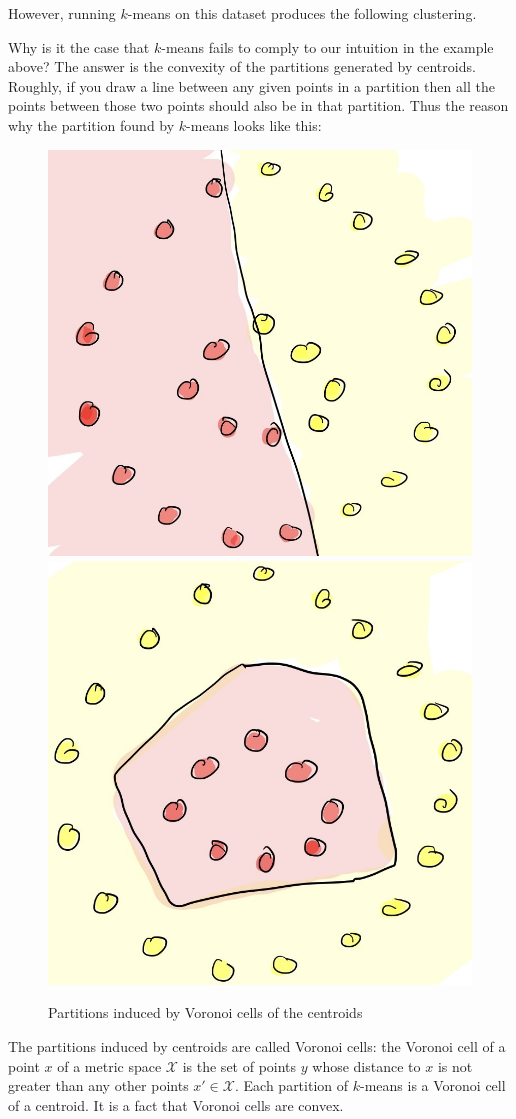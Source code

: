 However, running $k$-means on this dataset produces the following clustering.


Why is it the case that $k$-means fails to comply to our intuition in the example
above? The answer is the convexity of the partitions generated by centroids. Roughly,
if you draw a line between any given points in a partition then all the points
between those two points should also be in that partition. Thus the reason
why the partition found by $k$-means looks like this:

\begin{figure}
\begin{center}
\includegraphics[width=.49\linewidth]{chapter_2/files/voronoi-cell.jpg}
\includegraphics[width=.49\linewidth]{chapter_2/files/intuition-cell.jpg}
\end{center}
\caption{Partitions induced by Voronoi cells of the centroids}
\end{figure}

The partitions induced by centroids are called Voronoi cells: the Voronoi
cell of a point $x$ of a metric space $\mathcal{X}$ is the set of points
$y$ whose distance to $x$ is not greater than any other points $x' \in \mathcal{X}$.
Each partition of $k$-means is a Voronoi cell of a centroid. It is a fact that
Voronoi cells are convex.

